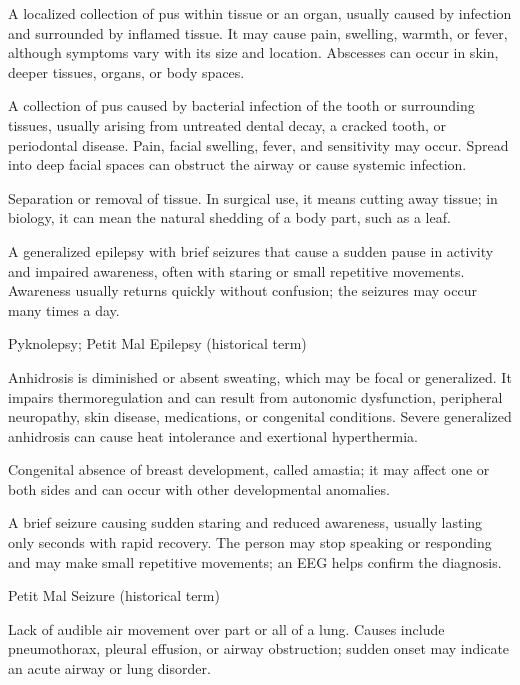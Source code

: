  A localized collection of pus within tissue or an organ, usually caused by infection and surrounded
by inflamed tissue. It may cause pain, swelling, warmth, or fever, although symptoms vary with its size and
location. Abscesses can occur in skin, deeper tissues, organs, or body spaces.

 A collection of pus caused by bacterial infection of the tooth or surrounding tissues, usually arising from untreated dental decay, a cracked tooth, or periodontal disease. Pain, facial swelling, fever, and sensitivity may occur. Spread into deep facial spaces can obstruct the airway or cause systemic infection.

 Separation or removal of tissue. In surgical use, it means cutting away tissue; in biology, it can mean the natural shedding of a body part, such as a leaf.

 A generalized epilepsy with brief seizures that cause a sudden pause in activity and impaired awareness, often with staring or small repetitive movements. Awareness usually returns quickly without confusion; the seizures may occur many times a day.

\synonyms
Pyknolepsy; Petit Mal Epilepsy (historical term)

 Anhidrosis is diminished or absent sweating, which may be focal or generalized. It impairs thermoregulation and can result from autonomic dysfunction, peripheral neuropathy, skin disease, medications, or congenital conditions. Severe generalized anhidrosis can cause heat intolerance and exertional hyperthermia.

 Congenital absence of breast development, called amastia; it may affect one or both sides and can occur with other developmental anomalies.

 A brief seizure causing sudden staring and reduced awareness, usually lasting only seconds with rapid recovery. The person may stop speaking or responding and may make small repetitive movements; an EEG helps confirm the diagnosis.

\synonyms
Petit Mal Seizure (historical term)

 Lack of audible air movement over part or all of a lung. Causes include pneumothorax, pleural effusion, or
airway obstruction; sudden onset may indicate an acute airway or lung disorder.

